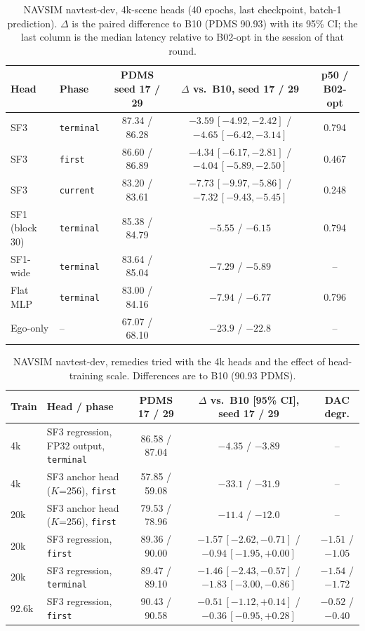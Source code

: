 \documentclass[10pt]{article}
\newcommand{\first}{\texttt{first}}
\newcommand{\current}{\texttt{current}}
\newcommand{\terminal}{\texttt{terminal}}
\begin{document}
\begin{table}[H]
\caption{NAVSIM navtest-dev, 4k-scene heads (40 epochs, last checkpoint, batch-1 prediction). $\Delta$ is the paired difference to B10 (PDMS 90.93) with its 95\% CI; the last column is the median latency relative to B02-opt in the session of that round.}
\label{tab:navsim-phases}
\begin{center}
\footnotesize
\setlength{\tabcolsep}{4pt}
\begin{tabular}{llccc}
\toprule
Head & Phase & PDMS seed 17 / 29 & $\Delta$ vs.\ B10, seed 17 / 29 & p50 / B02-opt \\
\midrule
SF3 & \terminal{} & 87.34 / 86.28 & $-3.59\,[-4.92,-2.42]$ / $-4.65\,[-6.42,-3.14]$ & 0.794 \\
SF3 & \first{}    & 86.60 / 86.89 & $-4.34\,[-6.17,-2.81]$ / $-4.04\,[-5.89,-2.50]$ & 0.467 \\
SF3 & \current{}  & 83.20 / 83.61 & $-7.73\,[-9.97,-5.86]$ / $-7.32\,[-9.43,-5.45]$ & 0.248 \\
SF1 (block 30) & \terminal{} & 85.38 / 84.79 & $-5.55$ / $-6.15$ & 0.794 \\
SF1-wide & \terminal{} & 83.64 / 85.04 & $-7.29$ / $-5.89$ & -- \\
Flat MLP & \terminal{} & 83.00 / 84.16 & $-7.94$ / $-6.77$ & 0.796 \\
Ego-only & -- & 67.07 / 68.10 & $-23.9$ / $-22.8$ & -- \\
\bottomrule
\end{tabular}
\end{center}
\end{table}

\begin{table}[H]
\caption{NAVSIM navtest-dev, remedies tried with the 4k heads and the effect of head-training scale. Differences are to B10 (90.93 PDMS).}
\begin{center}
\footnotesize
\setlength{\tabcolsep}{3pt}
\begin{tabular}{llccc}
\toprule
Train & Head / phase & PDMS 17 / 29 & $\Delta$ vs.\ B10 [95\% CI], seed 17 / 29 & DAC degr. \\
\midrule
4k & SF3 regression, FP32 output, \terminal{} & 86.58 / 87.04 & $-4.35$ / $-3.89$ & -- \\
4k & SF3 anchor head ($K$=256), \first{} & 57.85 / 59.08 & $-33.1$ / $-31.9$ & -- \\
20k & SF3 anchor head ($K$=256), \first{} & 79.53 / 78.96 & $-11.4$ / $-12.0$ & -- \\
20k & SF3 regression, \first{} & 89.36 / 90.00 & $-1.57\,[-2.62,-0.71]$ / $-0.94\,[-1.95,+0.00]$ & $-1.51$ / $-1.05$ \\
20k & SF3 regression, \terminal{} & 89.47 / 89.10 & $-1.46\,[-2.43,-0.57]$ / $-1.83\,[-3.00,-0.86]$ & $-1.54$ / $-1.72$ \\
92.6k & SF3 regression, \first{} & 90.43 / 90.58 & $-0.51\,[-1.12,+0.14]$ / $-0.36\,[-0.95,+0.28]$ & $-0.52$ / $-0.40$ \\
\bottomrule
\end{tabular}
\end{center}
\end{table}
\end{document}

